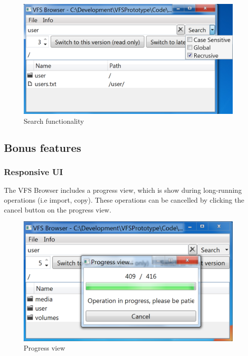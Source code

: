 \documentclass[a4paper,12pt]{article}
\begin{document}
\begin{figure}[h!]
  \centering
  \includegraphics[scale=0.35]{Images/search.png} 
  \caption{Search functionality}
\end{figure}

\subsection{Bonus features}
\subsubsection{Responsive UI}
The VFS Browser includes a progress view, which is show during long-running operations (i.e import, copy). These operations can be cancelled by clicking the cancel button on the progress view.
\begin{figure}[h!]
  \centering
  \includegraphics[scale=0.35]{Images/progress.png} 
  \caption{Progress view}
\end{figure}
\end{document}
